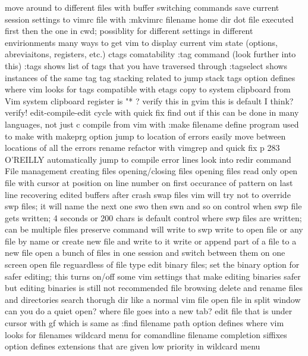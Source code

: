 \documentclass[12pt]{book}
\begin{document}
{{    move around to different files with buffer switching commands
    save current session settings to vimrc file with :mkvimrc filename
  home dir dot file executed first then the one in cwd; possiblity for different settings in different envirionments
  many ways to get vim to display current vim state (options, abreviaitons, registers, etc.)
  ctags comatability
    :tag command (look further into this)
    :tags shows list of tags that you have traversed through
    :tagselect shows instances of the same tag
    tag stacking
      related to jump stack
    tags option defines where vim looks for tags
    compatible with etags
  copy to system clipboard from Vim
    system clipboard register is "* ?  verify this
    in gvim this is default I think? verify!
  edit-compile-edit cycle with quick fix
    find out if this can be done in many languages, not just c
    compile from vim with :make filename
    define program used to make with makeprg option
    jump to location of errors
    easily move between locations of all the errors
  rename refactor with vimgrep and quick fix
    p 283 O'REILLY
  automatically jump to compile error lines
    look into redir command
  File management
    creating files
    opening/closing files
    opening files read only
    open file with cursor at position
      on line number
      on first occurance of pattern
      on last line
    recovering edited buffers after crash
      swap files
      vim will try not to override swp files; it will name the next one swo then swn and so on
      control when swp file gets written; 4 seconds or 200 chars is default
      control where swp files are written; can be multiple files
      preserve command will write to swp
    write to open file or any file by name or create new file and write to it
    write or append part of a file to a new file
    open a bunch of files in one session and switch between them on one screen
    open file reguardless of file type
      edit binary files; set the binary option for safer editing; this turns on/off some vim settings that make editing binaries safer but editing binaries is still not recommended
    file browsing
      delete and rename files and directories
      search thorugh dir like a normal vim file
      open file in split window
      can you do a quiet open? where file goes into a new tab?
      edit file that is under cursor with gf which is same as :find filename
        path option defines where vim looks for filenames
      wildcard menu for comandline filename completion
        siffixes option defines extensions that are given low priority in wildcard menu
}}
\end{document}
